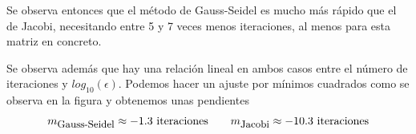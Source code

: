 \documentclass{article}
\begin{document}
Se observa entonces que el método de Gauss-Seidel es mucho más rápido que el de Jacobi, necesitando entre 5 y 7 veces menos iteraciones, al menos para esta matriz en concreto.


Se observa además que hay una relación lineal en ambos casos entre el número de iteraciones y $log_{10}(\epsilon)$. Podemos hacer un ajuste por mínimos cuadrados como se observa en la figura y obtenemos unas pendientes
\[m_{\mbox{\small Gauss-Seidel}} \approx -1.3 \mbox{ iteraciones} \ \ \ \ \ \ m_{\mbox{\small Jacobi}} \approx -10.3 \mbox{ iteraciones}\]
\end{document}
